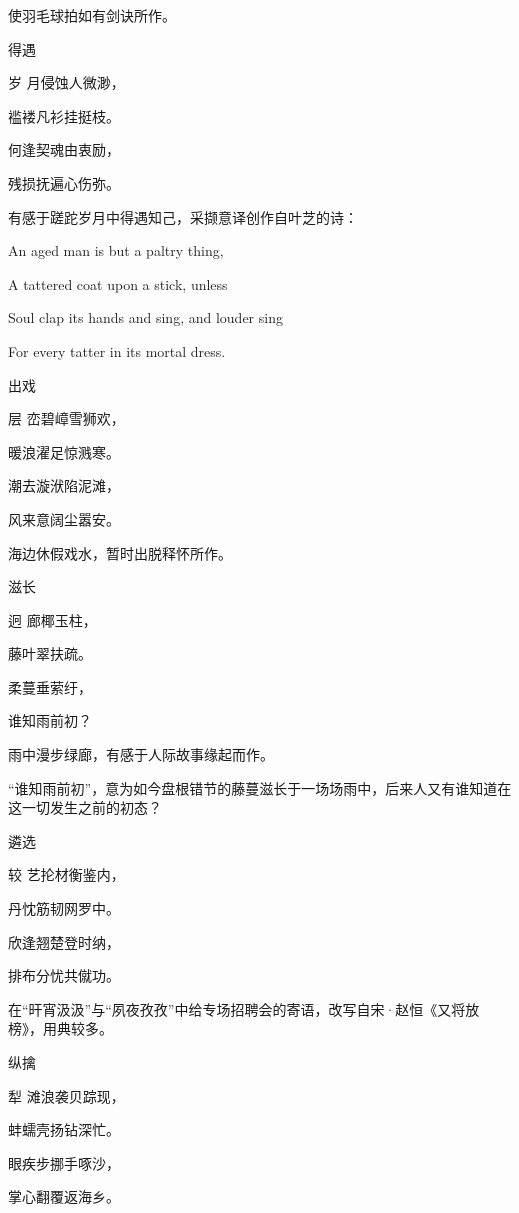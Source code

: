 \documentclass{article}
\newenvironment{poem}[3]{
\begin{minipage}{\textwidth}
\begin{pinyinscope}\begin{center}\Large\linespread{1.4}\selectfont #2\end{center}\end{pinyinscope}
\begin{pinyinscope}
	\begin{center}
	\Large\linespread{1.4}\rmfamily\selectfont #3
}{\end{center}
\end{pinyinscope}
\end{minipage}
}
\begin{document}
使羽毛球拍如有剑诀所作。

\begin{poem}{}{得遇}
岁月侵蚀人微渺，

褴褛凡衫挂挺枝。

何逢契魂由衷励，

残损抚遍心伤弥。
\end{poem}

有感于蹉跎岁月中得遇知己，采撷意译创作自叶芝的诗：

\begin{displayquote}
An aged man is but a paltry thing,

A tattered coat upon a stick, unless

Soul clap its hands and sing, and louder sing

For every tatter in its mortal dress.
\end{displayquote}

\begin{poem}{}{出戏}
层峦碧嶂雪狮欢，

暖浪濯足惊溅寒。

潮去漩{\textsf 洑}陷泥滩，

风来意阔尘嚣安。
\end{poem}

海边休假戏水，暂时出脱释怀所作。

\begin{poem}{}{滋长}
迥廊椰玉柱，

藤叶翠扶疏。

柔蔓垂萦纡，

谁知雨前初？
\end{poem}

雨中漫步绿廊，有感于人际故事缘起而作。

“谁知雨前初”，意为如今盘根错节的藤蔓滋长于一场场雨中，后来人又有谁知道在这一切发生之前的初态？

\begin{poem}{}{遴选}
较艺抡材衡鉴内，

丹忱筋韧网罗中。

欣逢翘楚登时纳，

排布分忧共僦功。
\end{poem}

在“旰宵汲汲”与“夙夜孜孜”中给专场招聘会的寄语，改写自宋·赵恒《又将放榜》，用典较多。

\begin{poem}{}{纵擒}
犁滩浪袭贝踪现，

蚌蠕壳扬钻深忙。

眼疾步挪手啄沙，

掌心翻覆返海乡。
\end{poem}
\end{document}
